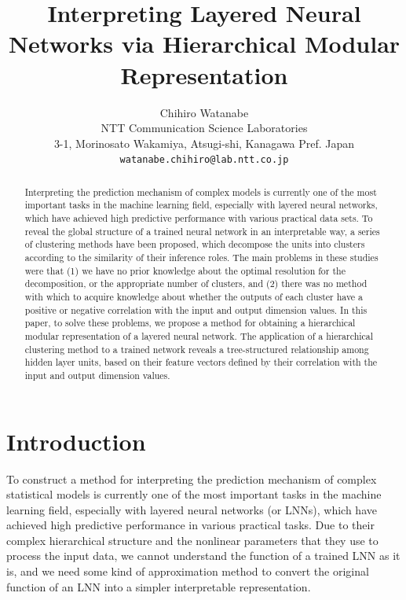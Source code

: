 \documentclass{article}
\title{Interpreting Layered Neural Networks via Hierarchical Modular Representation}
\author{Chihiro Watanabe\\
NTT Communication Science Laboratories\\
3-1, Morinosato Wakamiya, Atsugi-shi, Kanagawa Pref. Japan\\
\texttt{watanabe.chihiro@lab.ntt.co.jp}}
\begin{document}
\maketitle

\begin{abstract}
Interpreting the prediction mechanism of complex models is currently one of the most important tasks in the machine learning field, especially with layered neural networks, which have achieved high predictive performance with various practical data sets. To reveal the global structure of a trained neural network in an interpretable way, a series of clustering methods have been proposed, which decompose the units into clusters according to the similarity of their inference roles. The main problems in these studies were that (1) we have no prior knowledge about the optimal resolution for the decomposition, or the appropriate number of clusters, and (2) there was no method with which to acquire knowledge about whether the outputs of each cluster have a positive or negative correlation with the input and output dimension values. 
In this paper, to solve these problems, we propose a method for obtaining a hierarchical modular representation of a layered neural network. The application of a hierarchical clustering method to a trained network reveals a tree-structured relationship among hidden layer units, based on their feature vectors defined by their correlation with the input and output dimension values. 
\end{abstract}


\section{Introduction}

To construct a method for interpreting the prediction mechanism of complex statistical models is currently one of the most important tasks in the machine learning field, especially with layered neural networks (or LNNs), which have achieved high predictive performance in various practical tasks. Due to their complex hierarchical structure and the nonlinear parameters that they use to process the input data, we cannot understand the function of a trained LNN as it is, and we need some kind of approximation method to convert the original function of an LNN into a simpler interpretable representation. 
\end{document}
